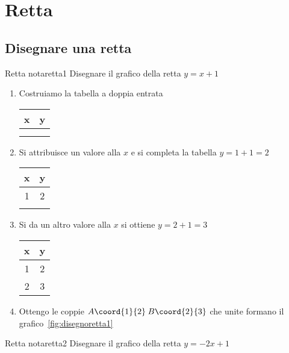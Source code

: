 \chapter{Retta}
\label{cha:retta}
\section{Disegnare una retta}
\begin{esempiot}{Retta nota}{retta1}
	Disegnare il grafico della retta $y=x+1$
\end{esempiot}
\begin{enumerate}
	\item Costruiamo la tabella a doppia entrata 
		\begin{tabular}{c|c}
		x & y\\
		\hline 
		&  \\ 
		&  \\ 
	\end{tabular}
	\item Si attribuisce  un valore alla $x$ e si completa la tabella
	$y=1+1=2$
	\begin{tabular}{c|c}
		x & y\\
		\hline 
		1	& 2 \\ 
		&  \\ 
	\end{tabular}
	\item Si da un altro valore alla $x$ si ottiene 
	$y=2+1=3$
	\begin{tabular}{c|c}
		x & y\\
		\hline 
		1	& 2 \\ 
		2& 3 \\ 
	\end{tabular}
	\item Ottengo le coppie $A\coord{1}{2}$\,$B\coord{2}{3}$ che unite formano il grafico~\vref{fig:disegnoretta1}
\end{enumerate}
\begin{center}

\label{fig:disegnoretta1}
\end{center}
\begin{esempiot}{Retta nota}{retta2}
	Disegnare il grafico della retta $y=-2x+1$
\end{esempiot}
